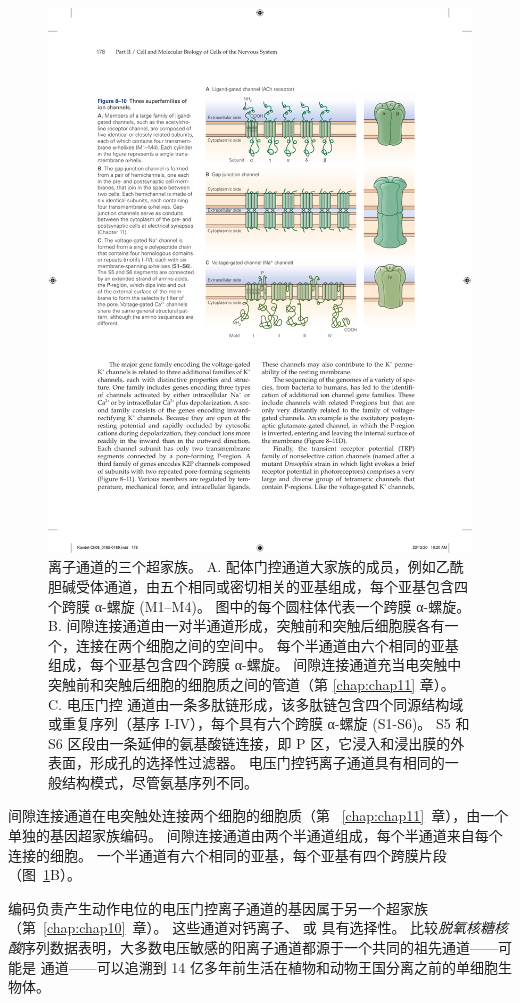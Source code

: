 \begin{figure}[htbp]
	\centering
	\includegraphics[width=0.7\linewidth]{chap08/fig_8_10}
	\caption{离子通道的三个超家族。 A. 配体门控通道大家族的成员，例如乙酰胆碱受体通道，由五个相同或密切相关的亚基组成，每个亚基包含四个跨膜 α-螺旋 (M1–M4)。 图中的每个圆柱体代表一个跨膜 α-螺旋。 B. 间隙连接通道由一对半通道形成，突触前和突触后细胞膜各有一个，连接在两个细胞之间的空间中。 每个半通道由六个相同的亚基组成，每个亚基包含四个跨膜 α-螺旋。 间隙连接通道充当电突触中突触前和突触后细胞的细胞质之间的管道（第 \ref{chap:chap11} 章）。 C. 电压门控  通道由一条多肽链形成，该多肽链包含四个同源结构域或重复序列（基序 I-IV），每个具有六个跨膜 α-螺旋 (S1-S6)。 S5 和 S6 区段由一条延伸的氨基酸链连接，即 P 区，它浸入和浸出膜的外表面，形成孔的选择性过滤器。 电压门控钙离子通道具有相同的一般结构模式，尽管氨基序列不同。}
	\label{fig:8_10}
\end{figure}




间隙连接通道在电突触处连接两个细胞的细胞质（第 ~\ref{chap:chap11}~章），由一个单独的基因超家族编码。
间隙连接通道由两个半通道组成，每个半通道来自每个连接的细胞。
一个半通道有六个相同的亚基，每个亚基有四个跨膜片段（图~\ref{fig:8_10}B）。


编码负责产生动作电位的电压门控离子通道的基因属于另一个超家族（第~\ref{chap:chap10}~章）。
这些通道对钙离子、 或  具有选择性。
比较\textit{脱氧核糖核酸}序列数据表明，大多数电压敏感的阳离子通道都源于一个共同的祖先通道——可能是  通道——可以追溯到 14 亿多年前生活在植物和动物王国分离之前的单细胞生物体。


